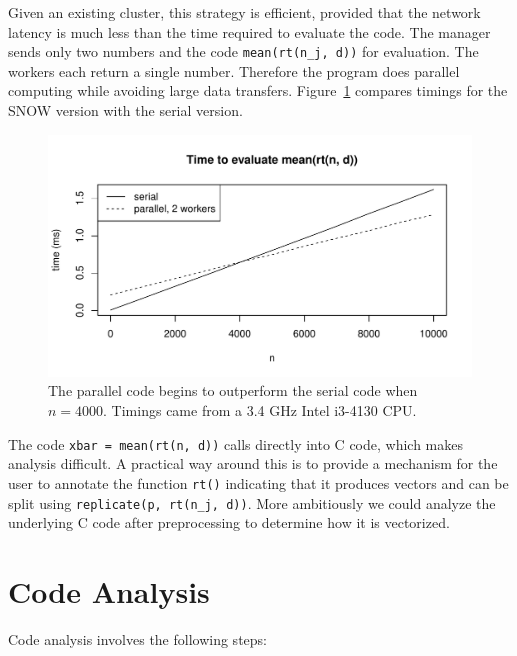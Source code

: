 \documentclass[12pt]{article}
\begin{document}
Given an existing cluster, this strategy is efficient, provided that the
network latency is much less than the time required to evaluate the code.
The manager sends only two numbers and the code \texttt{mean(rt(n\_j, d))}
for evaluation. The workers each return a single number. Therefore the
program does parallel computing while avoiding large data transfers. 
Figure~\ref{fig:ser_vs_par} compares timings for the SNOW version with the
serial version.

\begin{figure}
\centering
\includegraphics[width=.7\linewidth]{compute_times/ser_vs_par.pdf}
\caption{The parallel code begins to outperform the serial code when $n =
    4000$. Timings came from a 3.4 GHz Intel i3-4130 CPU.}
\label{fig:ser_vs_par}
\end{figure}


The code \texttt{xbar = mean(rt(n, d))} calls directly into C code, which
makes analysis difficult. A practical way around this is to provide a
mechanism for the user to annotate the function \texttt{rt()} indicating
that it produces vectors and can be split using \texttt{replicate(p,
rt(n\_j, d))}. More ambitiously we could analyze the underlying C code after
preprocessing to determine how it is vectorized.

\section{Code Analysis}

Code analysis involves the following steps:
\end{document}
